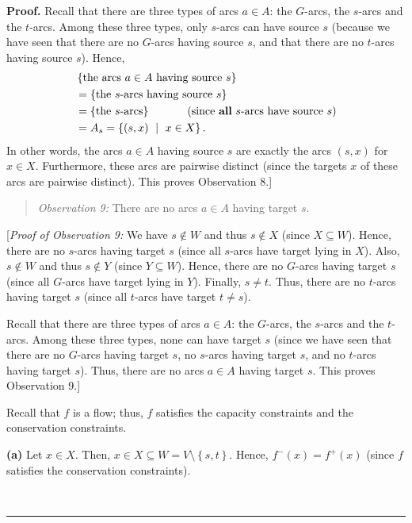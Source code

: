 \documentclass[numbers=enddot,12pt,final,onecolumn,notitlepage]{scrartcl}%
\theoremstyle{definition}
\newenvironment{statement}{\begin{quote}}{\end{quote}}
\newenvironment{proof}[1][Proof]{\noindent\textbf{#1.} }{\ \rule{0.5em}{0.5em}}
\begin{document}
\begin{proof}
Recall that there are three types of arcs $a\in A$: the $G$-arcs, the $s$-arcs
and the $t$-arcs. Among these three types, only $s$-arcs can have source $s$
(because we have seen that there are no $G$-arcs having source $s$, and that
there are no $t$-arcs having source $s$). Hence,%
\begin{align*}
&  \left\{  \text{the arcs }a\in A\text{ having source }s\right\} \\
&  =\left\{  \text{the }s\text{-arcs having source }s\right\} \\
&  =\left\{  \text{the }s\text{-arcs}\right\}  \ \ \ \ \ \ \ \ \ \ \left(
\text{since \textbf{all} }s\text{-arcs have source }s\right) \\
&  =A_{s}=\left\{  \left(  s,x\right)  \ \mid\ x\in X\right\}  .
\end{align*}
In other words, the arcs $a\in A$ having source $s$ are exactly the arcs
$\left(  s,x\right)  $ for $x\in X$. Furthermore, these arcs are pairwise
distinct (since the targets $x$ of these arcs are pairwise distinct). This
proves Observation 8.]

\begin{statement}
\textit{Observation 9:} There are no arcs $a\in A$ having target $s$.
\end{statement}

[\textit{Proof of Observation 9:} We have $s\notin W$ and thus $s\notin X$
(since $X\subseteq W$). Hence, there are no $s$-arcs having target $s$ (since
all $s$-arcs have target lying in $X$). Also, $s\notin W$ and thus $s\notin Y$
(since $Y\subseteq W$). Hence, there are no $G$-arcs having target $s$ (since
all $G$-arcs have target lying in $Y$). Finally, $s\neq t$. Thus, there are no
$t$-arcs having target $s$ (since all $t$-arcs have target $t\neq s$).

Recall that there are three types of arcs $a\in A$: the $G$-arcs, the $s$-arcs
and the $t$-arcs. Among these three types, none can have target $s$ (since we
have seen that there are no $G$-arcs having target $s$, no $s$-arcs having
target $s$, and no $t$-arcs having target $s$). Thus, there are no arcs $a\in
A$ having target $s$. This proves Observation 9.]

Recall that $f$ is a flow; thus, $f$ satisfies the capacity constraints and
the conservation constraints.

\textbf{(a)} Let $x\in X$. Then, $x\in X\subseteq W=V\setminus\left\{
s,t\right\}  $. Hence, $f^{-}\left(  x\right)  =f^{+}\left(  x\right)  $
(since $f$ satisfies the conservation constraints).


\end{proof}
\end{document}
